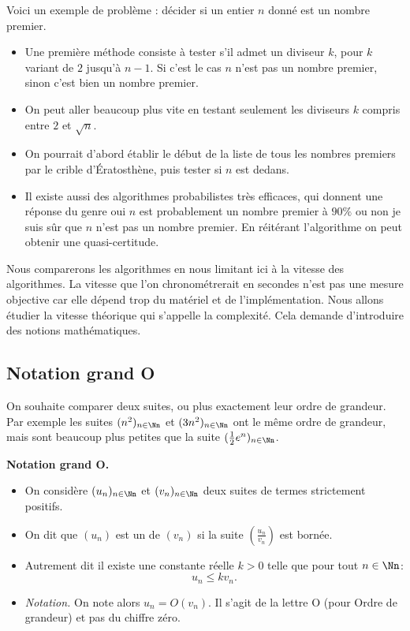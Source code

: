 \documentclass[11pt,class=report,crop=false]{standalone}
\begin{document}
Voici un exemple de problème : décider si un entier $n$ donné est un nombre premier.
\begin{itemize}
  \item Une première méthode consiste à tester s'il admet un diviseur $k$, pour $k$ variant de $2$ jusqu'à $n-1$. Si c'est le cas $n$ n'est pas un nombre premier, sinon c'est bien un nombre premier.
  \item On peut aller beaucoup plus vite en testant seulement les diviseurs $k$
  compris entre $2$ et $\sqrt n$.
  \item On pourrait d'abord établir le début de la liste de tous les nombres premiers par le crible d'Ératosthène, puis tester si $n$ est dedans.
  \item Il existe aussi des algorithmes probabilistes très efficaces,
  qui donnent une réponse du genre \og{}oui $n$ est probablement un nombre premier à $90\%$\fg{} ou \og{}non je suis sûr que $n$ n'est pas un nombre premier\fg{}.
  En réitérant l'algorithme on peut obtenir une quasi-certitude.
\end{itemize}

Nous comparerons les algorithmes en nous limitant ici à la \og{}vitesse\fg{} des algorithmes.
La vitesse que l'on chronométrerait en secondes n'est pas une mesure objective car elle dépend trop du matériel et de l'implémentation. Nous allons étudier la vitesse théorique qui s'appelle la \og{}complexité\fg{}.
Cela demande d'introduire des notions mathématiques.


\subsection{Notation \og{}grand O\fg{}}

On souhaite comparer deux suites, ou plus exactement leur ordre de grandeur. Par exemple les suites $(n^2)_{n\in\Nn}$ et $(3n^2)_{n\in\Nn}$ ont le même ordre de grandeur, mais sont beaucoup plus petites que la suite $(\frac12 e^n)_{n\in\Nn}$. 

\textbf{Notation \og{}grand O\fg{}.}
\begin{itemize}
	\item On considère $(u_n)_{n\in\Nn}$ et $(v_n)_{n\in\Nn}$ deux suites de termes strictement positifs.
	\item On dit que $(u_n)$ est un  de $(v_n)$ si la suite $\left(\frac{u_n}{v_n}\right)$ est bornée.
    \item Autrement dit il existe une constante réelle $k>0$ telle que pour tout $n\in \Nn$:
$$u_n \le k v_n.$$
    \item \emph{Notation.} On note alors $u_n = O(v_n)$. Il s'agit de la lettre \og{}O\fg{} (pour Ordre de grandeur) et pas du chiffre zéro.
\end{itemize}
\end{document}

